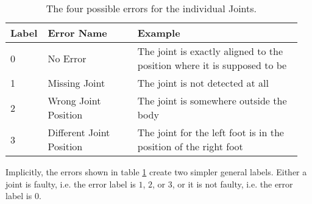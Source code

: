 \begin{table}[htb]
  \centering
  \caption{The four possible errors for the individual Joints.}
  \label{tab:jt_errs}
  \begin{tabular}{p{0.1\linewidth}p{0.3\linewidth}p{0.55\linewidth}}
  \hline
  \textbf{Label} & \textbf{Error Name}      & \textbf{Example} \\ \hline
  0                    & No Error                 & The joint is exactly aligned to the position where it is supposed to be \\
  1                    & Missing Joint            & The joint is not detected at all \\
  2                    & Wrong Joint Position     & The joint is somewhere outside the body \\
  3                    & Different Joint Position & The joint for the left foot is in the position of the right foot \\
  \hline   
  \end{tabular}
\end{table}

Implicitly, the errors shown in table \ref{tab:jt_errs} create two simpler general labels. Either a joint is faulty, i.e. the error label is $1$, $2$, or $3$, or it is not faulty, i.e. the error label is $0$.

